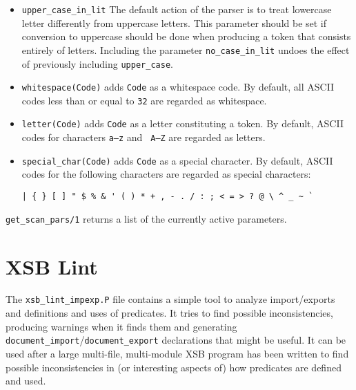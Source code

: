 \begin{description}
\begin{itemize}
\item{{\tt upper\_case\_in\_lit}} The default action of the parser is
to treat lowercase letter differently from uppercase letters.  This
parameter should be set if conversion to uppercase should be done when
producing a token that consists entirely of letters.  Including the
parameter {\tt no\_case\_in\_lit} undoes the effect of previously
including {\tt upper\_case}.

\item{{\tt whitespace(Code)}} adds {\tt Code} as a whitespace code.
By default, all ASCII codes less than or equal to {\tt 32} are
regarded as whitespace.

\item{{\tt letter(Code)}} adds {\tt Code} as a letter constituting a
token. By default, ASCII codes for characters {\tt a--z} and {\tt
A--Z} are regarded as letters.

\item{{\tt special\_char(Code)}} adds {\tt Code} as a special
  character.  By default, ASCII codes for the following characters are
  regarded as special characters:

\begin{verbatim}
| { } [ ] " $ % & ' ( ) * + , - . / : ; < = > ? @ \ ^ _ ~ `
\end{verbatim}
\end{itemize}

{\tt get\_scan\_pars/1} returns a list of the currently active
parameters.

\end{description} 

\section{XSB Lint}

The {\tt xsb\_lint\_impexp.P} file contains a simple tool to analyze
import/exports and definitions and uses of predicates.  It tries to
find possible inconsistencies, producing warnings when it finds them
and generating {\tt document\_import}/{\tt document\_export}
declarations that might be useful.  It can be used after a large
multi-file, multi-module XSB program has been written to find possible
inconsistencies in (or interesting aspects of) how predicates are
defined and used.

